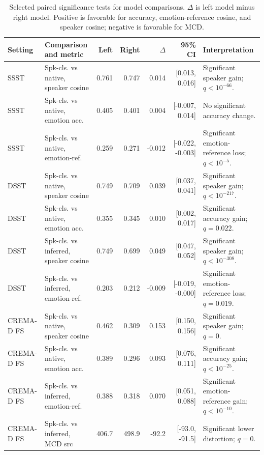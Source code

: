 \begin{table}[t]
\caption{Selected paired significance tests for model comparisons. $\Delta$ is left model minus right model. Positive is favorable for accuracy, emotion-reference cosine, and speaker cosine; negative is favorable for MCD.}
\label{tab:significance}
\centering
\scriptsize
\begin{tabular}{llrrrrp{}}
\toprule
Setting & Comparison and metric & Left & Right & $\Delta$ & 95\% CI & Interpretation \\
\midrule
SSST & Spk-cls. vs native, speaker cosine & 0.761 & 0.747 & 0.014 & [0.013, 0.016] & Significant speaker gain; $q<10^{-66}$. \\
SSST & Spk-cls. vs native, emotion acc. & 0.405 & 0.401 & 0.004 & [-0.007, 0.014] & No significant accuracy change. \\
SSST & Spk-cls. vs native, emotion-ref. & 0.259 & 0.271 & -0.012 & [-0.022, -0.003] & Significant emotion-reference loss; $q<10^{-5}$. \\
\midrule
DSST & Spk-cls. vs native, speaker cosine & 0.749 & 0.709 & 0.039 & [0.037, 0.041] & Significant speaker gain; $q<10^{-217}$. \\
DSST & Spk-cls. vs native, emotion acc. & 0.355 & 0.345 & 0.010 & [0.002, 0.017] & Significant accuracy gain; $q=0.022$. \\
DSST & Spk-cls. vs inferred, speaker cosine & 0.749 & 0.699 & 0.049 & [0.047, 0.052] & Significant speaker gain; $q<10^{-308}$. \\
DSST & Spk-cls. vs inferred, emotion-ref. & 0.203 & 0.212 & -0.009 & [-0.019, -0.000] & Significant emotion-reference loss; $q=0.019$. \\
\midrule
CREMA-D FS & Spk-cls. vs native, speaker cosine & 0.462 & 0.309 & 0.153 & [0.150, 0.156] & Significant speaker gain; $q=0$. \\
CREMA-D FS & Spk-cls. vs native, emotion acc. & 0.389 & 0.296 & 0.093 & [0.076, 0.111] & Significant accuracy gain; $q<10^{-25}$. \\
CREMA-D FS & Spk-cls. vs inferred, emotion-ref. & 0.388 & 0.318 & 0.070 & [0.051, 0.088] & Significant emotion-reference gain; $q<10^{-10}$. \\
CREMA-D FS & Spk-cls. vs inferred, MCD src & 406.7 & 498.9 & -92.2 & [-93.0, -91.5] & Significant lower distortion; $q=0$. \\
\bottomrule
\end{tabular}
\end{table}

